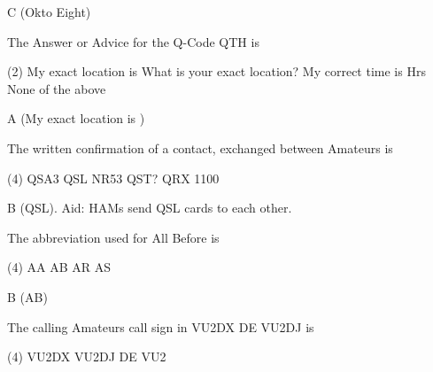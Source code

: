 \documentclass[a4paper]{article}
\begin{document}
\begin{solution}
	C (Okto Eight)
\end{solution}

\vspace{5mm}



\begin{question}The Answer or Advice for the Q-Code \apostrophe{}QTH\apostrophe{} is \spaces
	\begin{tasks}(2)
		\task My exact location is \spaces
		\task What is your exact location?
		\task My correct time is {\spaces} Hrs
		\task None of the above
	\end{tasks}
\end{question}

\begin{solution}
	A (My exact location is \spaces)
\end{solution}

\vspace{5mm}



\begin{question}The written confirmation of a contact, exchanged between Amateurs is \spaces
	\begin{tasks}(4)
		\task QSA3
		\task QSL NR53
		\task QST?
		\task QRX 1100
	\end{tasks}
\end{question}

\begin{solution}
	B (QSL). Aid: HAMs send QSL cards to each other.
\end{solution}

\vspace{5mm}



\begin{question}The abbreviation used for \apostrophe{}All Before\apostrophe{} is \spaces
	\begin{tasks}(4)
		\task AA
		\task AB
		\task AR
		\task AS
	\end{tasks}
\end{question}

\begin{solution}
	B (AB)
\end{solution}

\vspace{5mm}



\begin{question}The calling Amateur\apostrophe{}s call sign in \apostrophe{}VU2DX DE VU2DJ\apostrophe{} is \spaces
	\begin{tasks}(4)
		\task VU2DX
		\task VU2DJ
		\task DE
		\task VU2
	\end{tasks}
\end{question}
\end{document}
